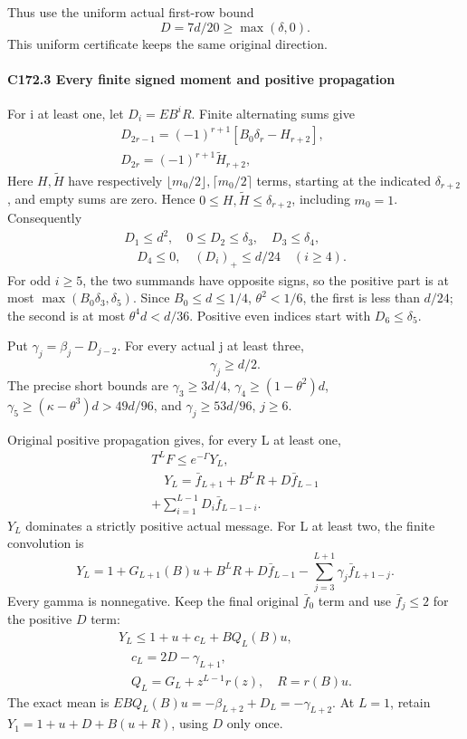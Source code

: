 Thus use the uniform actual first-row bound
\[
\boxed{D=7d/20\ge\max(\delta,0)}.                       \tag{C172.T179.14}
\]
This uniform certificate keeps the same original direction.

\paragraph{C172.3 Every finite signed moment and positive propagation}

For i at least one, let \(D_i=EB^iR.\) Finite alternating sums give
\[
\begin{gathered}
D_{2r-1}=(-1)^{r+1}[B_0\delta_r-H_{r+2}],\qquad\\
D_{2r}=(-1)^{r+1}\widetilde H_{r+2},
\end{gathered}\tag{C172.T179.15}
\]
Here \(H,\allowbreak \allowbreak  \widetilde H\) have respectively \(\lfloor m_0/2\rfloor,\allowbreak \allowbreak  \lceil m_0/2\rceil\) terms, starting at the indicated \(\delta_{r+2}\), and empty sums are zero. Hence \(0\le H,\allowbreak \allowbreak  \widetilde H\le \delta_{r+2}\), including \(m_0=1\). Consequently
\[
\begin{gathered}
D_1\le d^2,\quad0\le D_2\le \delta_3,\quad D_3\le \delta_4,\\
\quad D_4\le0,\quad(D_i)_+\le d/24\quad(i\ge4).
\end{gathered}\tag{C172.T179.16}
\]
For odd \(i\ge5\), the two summands have opposite signs, so the positive part is at most \(\max(B_0\delta_3,\allowbreak \allowbreak  \delta_5)\). Since \(B_0\le d\le1/4\), \(\theta^2<1/6\), the first is less than \(d/24\); the second is at most \(\theta^4d<d/36\). Positive even indices start with \(D_6\le \delta_5\).

Put \(\gamma_j=\beta_j-D_{j-2}.\) For every actual j at least three,
\[
\boxed{\gamma_j\ge d/2}.                              \tag{C172.T179.17}
\]
The precise short bounds are \(\gamma_3\ge3d/4\), \(\gamma_4\ge(1-\theta^2)d\), \(\gamma_5\ge(\kappa-\theta^3)d>49d/96\), and \(\gamma_j\ge53d/96\), \(j\ge6\).

Original positive propagation gives, for every L at least one,
\[
\begin{gathered}
T^LF\le e^{-\Gamma}Y_L,\\
\quad Y_L=\bar f_{L+1}+B^LR+D\bar f_{L-1}\\
+\sum_{i=1}^{L-1}D_i \bar f_{L-1-i}.
\end{gathered}\tag{C172.T179.18}
\]
\(Y_L\) dominates a strictly positive actual message. For L at least two, the finite convolution is
\[
Y_L=1+G_{L+1}(B)u+B^LR+D\bar f_{L-1}
-\sum_{j=3}^{L+1}\gamma_j \bar f_{L+1-j}.
\]
Every gamma is nonnegative. Keep the final original \(\bar f_0\) term and use \(\bar f_j\le2\) for the positive \(D\) term:
\[
\begin{gathered}
Y_L\le1+u+c_L+B Q_L(B)u,\\
\quad c_L=2D-\gamma_{L+1},\\
\quad Q_L=G_L+z^{L-1}r(z),\quad R=r(B)u.
\end{gathered}\tag{C172.T179.19}
\]
The exact mean is \(EBQ_L(B)u=-\beta_{L+2}+D_L=-\gamma_{L+2}\). At \(L=1\), retain \(Y_1=1+u+D+B(u+R)\), using \(D\) only once.


